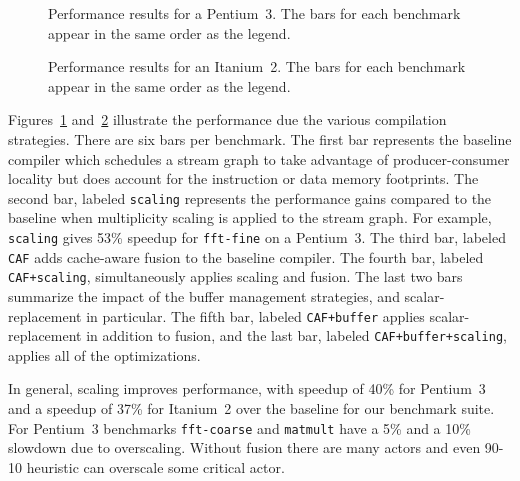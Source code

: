 

\begin{figure}[t]
  \vspace{-24pt}
  \hspace{-0.3in}
  \vspace{-48pt}
  \caption{Performance results for a Pentium~3.  The bars for each
  benchmark appear in the same order as the legend.}
  \label{fig:results-p3}
  \vspace{-6pt}
\end{figure}

\begin{figure}[t]
  \vspace{-36pt}
  \hspace{-0.3in}
  \vspace{-48pt}
  \caption{Performance results for an Itanium~2.  The bars for each
  benchmark appear in the same order as the legend.}
  \label{fig:results-ipf}
  \vspace{-12pt}
\end{figure}

Figures~\ref{fig:results-p3} and~\ref{fig:results-ipf} illustrate the
performance due the various compilation strategies. There are six bars
per benchmark. The first bar represents the baseline compiler which
schedules a stream graph to take advantage of producer-consumer
locality but does account for the instruction or data memory
footprints. The second bar, labeled {\tt scaling} represents the
performance gains compared to the baseline when multiplicity scaling
is applied to the stream graph. For example, {\tt scaling} gives 53\%
speedup for \texttt{fft-fine} on a Pentium~3. The third bar, 
labeled {\tt CAF} adds cache-aware fusion to the baseline compiler. The fourth
bar, labeled \texttt{CAF+scaling}, simultaneously applies scaling and
fusion. The last two bars summarize the impact of the buffer
management strategies, and scalar-replacement in particular. 
The fifth bar, labeled \texttt{CAF+buffer}
applies scalar-replacement in addition to fusion, and the last bar,
labeled \texttt{CAF+buffer+scaling}, applies all of the optimizations.

In general, scaling improves performance, with speedup of 
40\% for Pentium~3 and a speedup of 37\% for Itanium~2 over the baseline
for our benchmark suite. For Pentium~3 benchmarks \texttt{fft-coarse} and 
\texttt{matmult} have a 5\% and a 10\% slowdown due to overscaling. 
Without fusion there are many actors and even 90-10 heuristic can 
overscale some critical actor.

